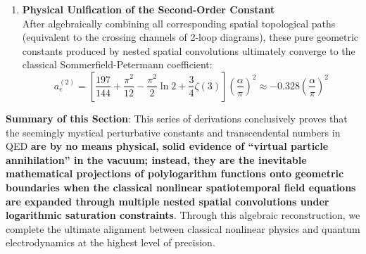 \documentclass[12pt, a4paper]{article}
\begin{document}
\begin{enumerate}
    \item \textbf{Physical Unification of the Second-Order Constant} \\
    After algebraically combining all corresponding spatial topological paths (equivalent to the crossing channels of 2-loop diagrams), these pure geometric constants produced by nested spatial convolutions ultimately converge to the classical Sommerfield-Petermann coefficient:
    \begin{equation}
    a_e^{(2)} = \left[ \frac{197}{144} + \frac{\pi^2}{12} - \frac{\pi^2}{2}\ln 2 + \frac{3}{4}\zeta(3) \right] \left(\frac{\alpha}{\pi}\right)^2 \approx -0.328 \left(\frac{\alpha}{\pi}\right)^2
    \end{equation}
\end{enumerate}

\textbf{Summary of this Section}: This series of derivations conclusively proves that the seemingly mystical perturbative constants and transcendental numbers in QED \textbf{are by no means physical, solid evidence of ``virtual particle annihilation'' in the vacuum; instead, they are the inevitable mathematical projections of polylogarithm functions onto geometric boundaries when the classical nonlinear spatiotemporal field equations are expanded through multiple nested spatial convolutions under logarithmic saturation constraints}. Through this algebraic reconstruction, we complete the ultimate alignment between classical nonlinear physics and quantum electrodynamics at the highest level of precision.
\end{document}
